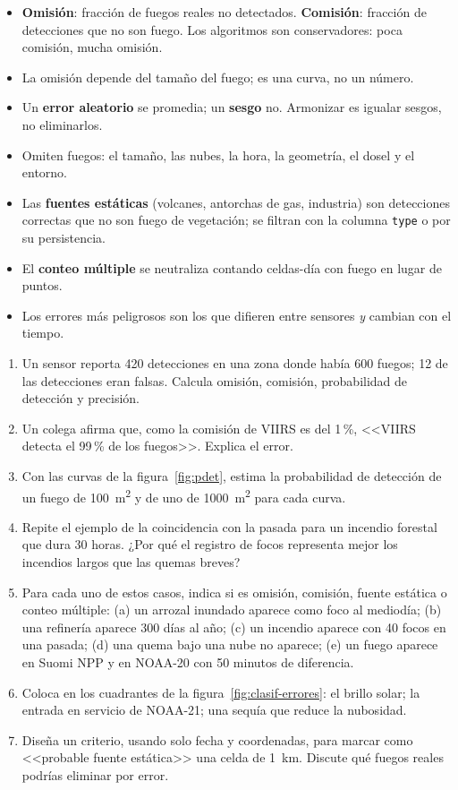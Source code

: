 \begin{itemize}
  \item \textbf{Omisión}: fracción de fuegos reales no detectados. \textbf{Comisión}: fracción
  de detecciones que no son fuego. Los algoritmos son conservadores: poca comisión, mucha
  omisión.
  \item La omisión depende del tamaño del fuego; es una curva, no un número.
  \item Un \textbf{error aleatorio} se promedia; un \textbf{sesgo} no. Armonizar es igualar
  sesgos, no eliminarlos.
  \item Omiten fuegos: el tamaño, las nubes, la hora, la geometría, el dosel y el entorno.
  \item Las \textbf{fuentes estáticas} (volcanes, antorchas de gas, industria) son detecciones
  correctas que no son fuego de vegetación; se filtran con la columna \texttt{type} o por su
  persistencia.
  \item El \textbf{conteo múltiple} se neutraliza contando celdas-día con fuego en lugar de
  puntos.
  \item Los errores más peligrosos son los que difieren entre sensores \emph{y} cambian con el
  tiempo.
\end{itemize}

\ejercicios

\begin{enumerate}
  \item Un sensor reporta 420 detecciones en una zona donde había 600 fuegos; 12 de las
  detecciones eran falsas. Calcula omisión, comisión, probabilidad de detección y precisión.
  \item Un colega afirma que, como la comisión de VIIRS es del 1\,{}\%, <<VIIRS detecta el 99\,{}\%
  de los fuegos>>. Explica el error.
  \item Con las curvas de la figura~\ref{fig:pdet}, estima la probabilidad de detección de un
  fuego de \SI{100}{\metre\squared} y de uno de \SI{1000}{\metre\squared} para cada curva.
  \item Repite el ejemplo de la coincidencia con la pasada para un incendio forestal que dura
  30 horas. ¿Por qué el registro de focos representa mejor los incendios largos que las quemas
  breves?
  \item Para cada uno de estos casos, indica si es omisión, comisión, fuente estática o conteo
  múltiple: (a) un arrozal inundado aparece como foco al mediodía; (b) una refinería aparece 300
  días al año; (c) un incendio aparece con 40 focos en una pasada; (d) una quema bajo una nube
  no aparece; (e) un fuego aparece en Suomi NPP y en NOAA-20 con 50 minutos de diferencia.
  \item Coloca en los cuadrantes de la figura~\ref{fig:clasif-errores}: el brillo solar; la
  entrada en servicio de NOAA-21; una sequía que reduce la nubosidad.
  \item Diseña un criterio, usando solo fecha y coordenadas, para marcar como <<probable fuente
  estática>> una celda de 1~km. Discute qué fuegos reales podrías eliminar por error.
\end{enumerate}
